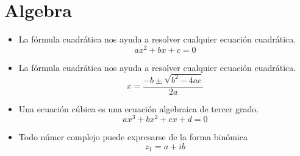 \documentclass[letterpaper,12pt]{article}
\begin{document}
\newpage


\section{Algebra}

\begin{itemize}
    \item[\hbar]La fórmula cuadrática nos ayuda a resolver cualquier ecuación cuadrática. 
    $$a x^2 + b x + c = 0 $$
    \item[\lhd]La fórmula cuadrática nos ayuda a resolver cualquier ecuación cuadrática.
    $$x = \frac {-b \pm \sqrt {b^2 - 4ac}}{2a} $$
    \item [\triangleright]Una ecuación cúbica es una ecuación algebraica de tercer grado. 
    $$ 	a x^3 + b x^2 + c x + d = 0 $$
    \item [\circ]Todo númer complejo puede expresarse de la forma binómica
     $$z_{1}=a+ib$$
\end{itemize}
\end{document}
